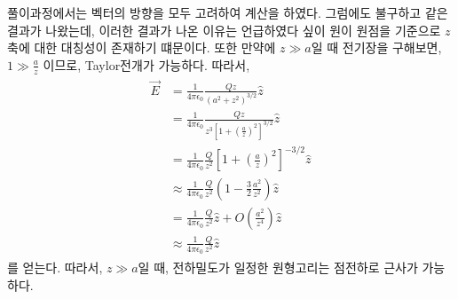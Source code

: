 \documentclass[tightenlines,floatfix,nofootinbib,superscriptaddress,fleqn]{revtex4-2}
\begin{document}
풀이과정에서는 벡터의 방향을 모두 고려하여 계산을 하였다. 그럼에도 불구하고 같은결과가 나왔는데, 이러한 결과가 나온 이유는 언급하였다 싶이 원이 원점을 기준으로 $z$축에 대한 대칭성이 존재하기 떄문이다.
또한 만약에 $z \gg a$일 때 전기장을 구해보면, $1\gg \frac{a}{z}$ 이므로, Taylor전개가 가능하다. 따라서,
\begin{align}
  \begin{split}
    \vec{E}&=\frac{1}{4 \pi \epsilon_0}\frac{Qz}{\left(a^2+z^2\right)^{3/2}}\hat{z}\\
    &=\frac{1}{4 \pi \epsilon_0}\frac{Qz}{z^3\left[1+\left(\frac{a}{z}\right)^2\right]^{3/2}}\hat{z}\\
    &=\frac{1}{4 \pi \epsilon_0}\frac{Q}{z^2}\left[1+\left(\frac{a}{z}\right)^2\right]^{-3/2}\hat{z}\\
    &\approx\frac{1}{4 \pi \epsilon_0}\frac{Q}{z^2}\left(1-\frac{3}{2}\frac{a^2}{z^2}\right)\hat{z}\\
    &=\frac{1}{4 \pi \epsilon_0}\frac{Q}{z^2}\hat{z}+O\left(\frac{a^2}{z^4}\right)\hat{z}\\
    &\approx\frac{1}{4 \pi \epsilon_0}\frac{Q}{z^2}\hat{z}
  \end{split}
\end{align}
를 얻는다. 따라서, $z \gg a$일 때, 전하밀도가 일정한 원형고리는 점전하로 근사가 가능하다.

\vspace{1.cm}
\end{document}
